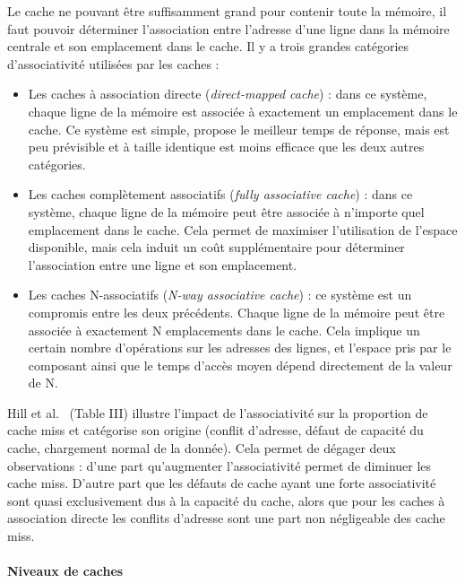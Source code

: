 Le cache ne pouvant être suffisamment grand pour contenir toute la mémoire, il faut pouvoir déterminer l'association entre l'adresse d'une ligne dans la mémoire centrale et son emplacement dans le cache.
Il y a trois grandes catégories d'associativité utilisées par les caches :
\begin{itemize}
  \item Les caches à association directe (\emph{direct-mapped cache}) : dans ce système, chaque ligne de la mémoire est associée à exactement un emplacement dans le cache.
    Ce système est simple, propose le meilleur temps de réponse, mais est peu prévisible et à taille identique est moins efficace que les deux autres catégories.
  \item Les caches complètement associatifs (\emph{fully associative cache}) : dans ce système, chaque ligne de la mémoire peut être associée à n'importe quel emplacement dans le cache.
    Cela permet de maximiser l'utilisation de l'espace disponible, mais cela induit un coût supplémentaire pour déterminer l'association entre une ligne et son emplacement.
  \item Les caches N-associatifs (\emph{N-way associative cache}) : ce système est un compromis entre les deux précédents.
    Chaque ligne de la mémoire peut être associée à exactement N emplacements dans le cache.
    Cela implique un certain nombre d'opérations sur les adresses des lignes, et l'espace pris par le composant ainsi que le temps d'accès moyen dépend directement de la valeur de N.
\end{itemize}

Hill et al.~\cite{Hill1989} (Table III) illustre l'impact de l'associativité sur la proportion de cache miss et catégorise son origine (conflit d'adresse, défaut de capacité du cache, chargement normal de la donnée).
Cela permet de dégager deux observations : d'une part qu'augmenter l'associativité permet de diminuer les cache miss.
D'autre part que les défauts de cache ayant une forte associativité sont quasi exclusivement dus à la capacité du cache, alors que pour les caches à association directe les conflits d'adresse sont une part non négligeable des cache miss.

\paragraph{Niveaux de caches}

